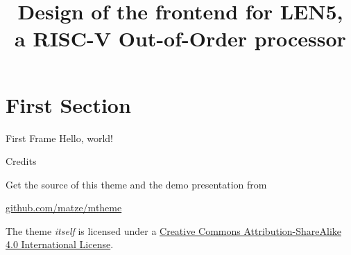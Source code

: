 \documentclass{beamer}
\title{Design of the frontend for LEN5,\\a RISC-V Out-of-Order processor}
\begin{document}
\begin{frame}[plain]
  \maketitle
\end{frame}
\addtocounter{framenumber}{-1}

\section{First Section}

\begin{frame}{First Frame}
  Hello, world!
\end{frame}

\begin{frame}{Credits}

  Get the source of this theme and the demo presentation from

  \begin{center}\url{github.com/matze/mtheme}\end{center}

  The theme \emph{itself} is licensed under a
  \href{http://creativecommons.org/licenses/by-sa/4.0/}{Creative Commons
  Attribution-ShareAlike 4.0 International License}.

  \begin{center}\ccbysa\end{center}

\end{frame}
\end{document}
